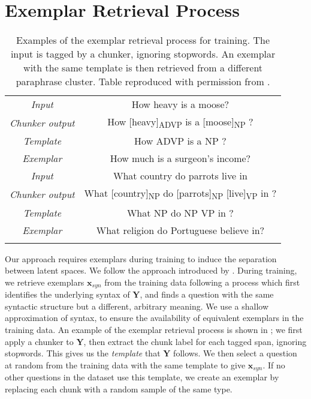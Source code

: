 \documentclass[11pt]{article}
\begin{document}
\section{Exemplar Retrieval Process}
\label{app:exemplars}




\begin{table}[t!]
    \small
    \centering
    \begin{tabular}{@{}c@{~}|@{~}c@{}}
    
    \hhline{==}
        \textit{Input} & How heavy is a moose? \\
\textit{Chunker output} & How [heavy]\textsubscript{ADVP} is a [moose]\textsubscript{NP} ? \\
\textit{Template} & How ADVP is a NP ? \\
\textit{Exemplar} & How much is a surgeon's income? \\
    \hhline{==}
        \textit{Input} & What country do parrots live in \\
\textit{Chunker output} & What [country]\textsubscript{NP} do  [parrots]\textsubscript{NP} [live]\textsubscript{VP} in ? \\
\textit{Template} & What NP do NP VP in ? \\
\textit{Exemplar} & What religion do Portuguese believe in? \\
     \hhline{==}
    \end{tabular}
\caption{Examples of the exemplar retrieval process for training. The input is tagged by a chunker, ignoring stopwords. An exemplar with the same template is then retrieved from a different paraphrase cluster. Table reproduced with permission from \citet{hosking-lapata-2021-factorising}.}
    \label{tab:templateexample}
\end{table}

Our approach requires exemplars during training
to induce the separation between latent spaces. We follow the approach introduced by \citet{hosking-lapata-2021-factorising}. During training, we retrieve exemplars $\textbf{x}_{syn}$ from the
training data following a process which first identifies the
underlying syntax of $\textbf{Y}$, and finds a question with the same
syntactic structure but a different, arbitrary meaning. We use a
shallow approximation of syntax, to ensure the availability of
equivalent exemplars in the training data. An example of the exemplar
retrieval process is shown in ; we first
apply a chunker \citep[FlairNLP, ][]{akbik-etal-2018-contextual} to
$\textbf{Y}$, then extract the chunk label for each tagged span,
ignoring stopwords. This gives us the \textit{template} that
$\textbf{Y}$ follows. We then select a question at random from the
training data with the same template to give $\textbf{x}_{syn}$. If no
other questions in the dataset use this template, we create an exemplar by replacing each chunk with a random sample of the same type.
\end{document}
